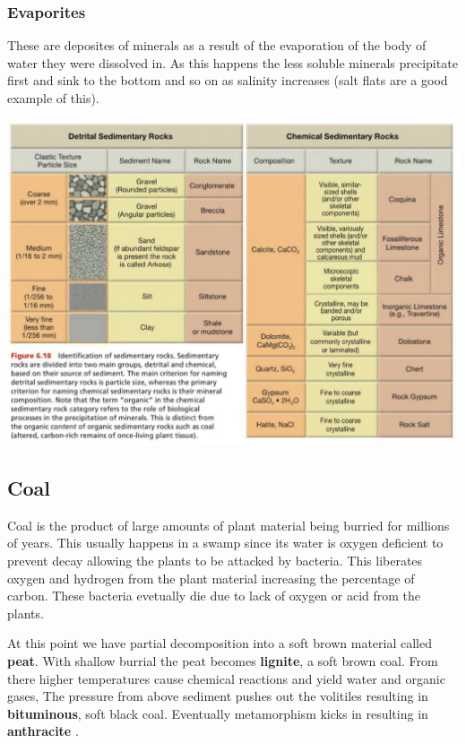 \documentclass{article}
\begin{document}
\subsubsection*{Evaporites} %
\label{sub:evaporites}
These are deposites of minerals as a result of the evaporation of the body of water they were dissolved in. As this happens the less soluble minerals precipitate first and sink to the bottom and so on as salinity increases (salt flats are a good example of this).

\includegraphics[width=7in]{sedimentary}

\subsection*{Coal} %
\label{sub:coal}
Coal is the product of large amounts of plant material being burried for millions of years. This usually happens in a swamp since its water is oxygen deficient to prevent decay allowing the plants to be attacked by bacteria. This liberates oxygen and hydrogen from the plant material increasing the percentage of carbon. These bacteria evetually die due to lack of oxygen or acid from the plants.

At this point we have partial decomposition into a soft brown material called \textbf{peat}. With shallow burrial the peat becomes \textbf{lignite}, a soft brown coal. From there higher temperatures cause chemical reactions and yield water and organic gases, The pressure from above sediment pushes out the volitiles resulting in \textbf{bituminous}, soft black coal. Eventually metamorphism kicks in resulting in \textbf{anthracite} .
\end{document}
